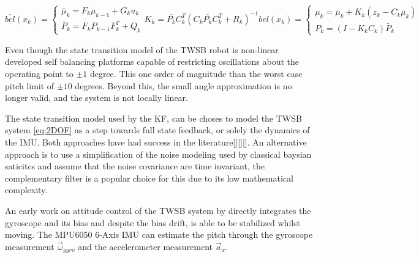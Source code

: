         \begin{subequations}
            \begin{equation}
                \bar{bel}(x_k) = \begin{cases}
                        \bar{\mu}_k = F_k \mu_{k-1} + G_k u_k \\
                        \bar{P}_k = F_k P_{k-1} F_k^T + Q_k
                        \end{cases}
                \label{eq:KalmanPredict}
            \end{equation}
            \begin{equation}
                K_k = \bar{P_k} C_k^T \left(C_k \bar{P_k} C_k^T + R_k \right)^{-1}
                \label{eq:KalmanGain}
            \end{equation}
            \begin{equation}
            bel(x_k) = \begin{cases}
                \mu_k = \bar{\mu}_k + K_k \left(z_k - C_k \bar{\mu}_k \right) \\
                P_k = \left(I - K_k C_k \right) \bar{P}_k
            \end{cases}
            \label{eq:KalmanUpdate}
            \end{equation}
            \label{eq:KalmanAlgorithm}
        \end{subequations}
     
        Even though the state transition model of the TWSB robot is non-linear
        \cite{ooi2003balancing} 
        developed self balancing platforms capable of restricting oscillations about the 
        operating point to $±1$ degree. This one order of magnitude than the worst case pitch limit of $±10$ degrees.
        Beyond this, the small angle approximation is no longer valid, and the system is not locally linear. 

        The state transition model used by the KF, can be choses to model the TWSB system \ref{eq:2DOF} as a step towards 
        full state feedback, or solely the dynamics of the IMU.  Both approaches have had success in the literature[][][]. 
        An alternative approach is to use a simplification of the noise modeling used by classical baysian saticitcs and 
        assume that the noise covariance are time invariant, the complementary filter \cite{ComplimentaryKalman} 
        is a popular choice for this due to its low mathematical complexity. 
     
        An early work on  attitude control of the TWSB system by \cite{SelfContainedMobileTWSB} directly integrates the gyroscope and its bias 
        and despite the bias drift, is able to be stabilized whilst moving. 
        The MPU6050 6-Axis IMU can estimate the pitch through the gyroscope measurement $\vec\omega_{gyro}$ and the accelerometer measurement $\vec a_{x}$.

